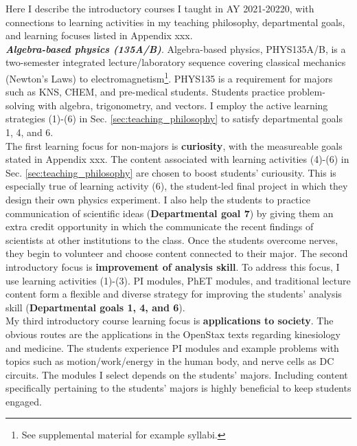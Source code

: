 \documentclass[../../../main.tex]{subfiles}
\begin{document}
\label{sec:intro_course_desc}

Here I describe the introductory courses I taught in AY 2021-20220, with connections to learning activities in my teaching philosophy, departmental goals, and learning focuses listed in Appendix xxx.
\\
\vspace{0.25cm}
\textbf{\textit{Algebra-based physics (135A/B)}}. Algebra-based physics, PHYS135A/B, is a two-semester integrated lecture/laboratory sequence covering classical mechanics (Newton's Laws) to electromagnetism\footnote{See supplemental material for example syllabi.}.  PHYS135 is a requirement for majors such as KNS, CHEM, and pre-medical students.  Students practice problem-solving with algebra, trigonometry, and vectors.  I employ the active learning strategies (1)-(6) in Sec. \ref{sec:teaching_philosophy} to satisfy departmental goals 1, 4, and 6.
\\
\vspace{0.25cm}
The first learning focus for non-majors is \textbf{curiosity}, with the measureable goals stated in Appendix xxx.  The content associated with learning activities (4)-(6) in Sec. \ref{sec:teaching_philosophy} are chosen to boost students' curiousity.  This is especially true of learning activity (6), the student-led final project in which they design their own physics experiment.  I also help the students to practice communication of scientific ideas (\textbf{Departmental goal 7}) by giving them an extra credit opportunity in which the communicate the recent findings of scientists at other institutions to the class.  Once the students overcome nerves, they begin to volunteer and choose content connected to their major.  The second introductory focus is \textbf{improvement of analysis skill}.  To address this focus, I use learning activities (1)-(3).  PI modules, PhET modules, and traditional lecture content form a flexible and diverse strategy for improving the students' analysis skill (\textbf{Departmental goals 1, 4, and 6}).
\\
\vspace{0.25cm}
My third introductory course learning focus is \textbf{applications to society}.  The obvious routes are the applications in the OpenStax texts \cite{openstax1} regarding kinesiology and medicine.  The students experience PI modules and example problems with topics such as motion/work/energy in the human body, and nerve cells as DC circuits.  The modules I select depends on the students' majors.  Including content specifically pertaining to the students' majors is highly beneficial to keep students engaged.
\end{document}
